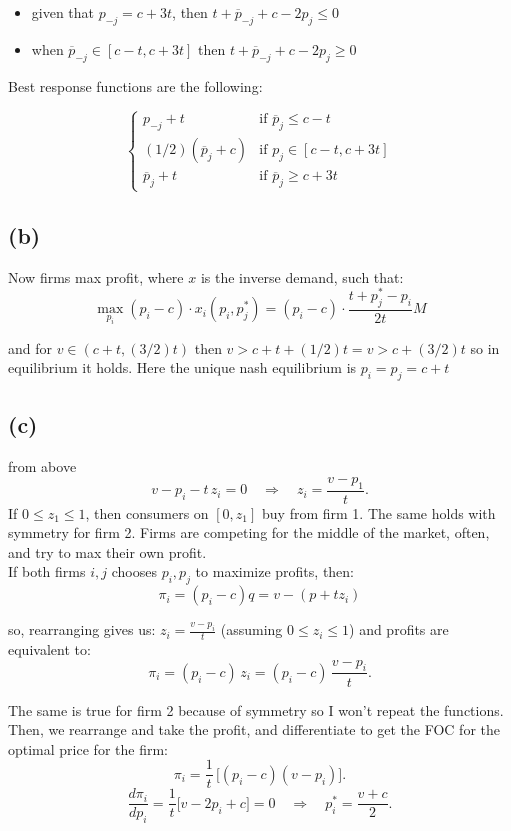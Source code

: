 \documentclass{article}
\begin{document}
\begin{itemize}
    \item given that $p_{-j} = c + 3t$, then $t + \overline{p}_{-j} + c - 2p_j \leq 0$
    \item when $\overline{p}_{-j} \in [c - t, c+3t]$ then $ t + \overline{p}_{-j} + c - 2p_j \geq 0$
\end{itemize}

Best response functions are the following:

\[
\left\{
  \begin{array}{ll}
    p_{-j} + t & \text{if } \overline{p}_{j} \leq c - t\\
    (1/2)(\overline{p}_j + c) & \text{if } p_j \in [c-t, c+3t]\\
    \overline{p}_j + t & \text{if } \overline{p}_j \geq c + 3t
    \end{array}
\right.
\]


\subsection*{(b)}
Now firms max profit, where $x$ is the inverse demand, such that: 
\[
\max_{p_i} (p_i - c) \cdot x_i(p_i, p_j^*) = (p_i - c) \cdot \frac{t + p_j^* - p_i}{2t} M
\]

and for $v \in (c + t, (3/2)t)$ then $ v > c + t + (1/2)t = v > c + (3/2)t$ so in equilibrium it holds. Here the unique nash equilibrium is $p_i = p_j = c + t $

\subsection*{(c)}
from above 
\[
v - p_i - t\, z_i = 0 \quad \Longrightarrow \quad z_i = \frac{v - p_1}{t}.
\]
If $0 \le z_1 \le 1$, then consumers on $[0, z_1]$ buy from firm 1. The same holds with symmetry for firm 2. Firms are competing for the middle of the market, often, and try to max their own profit. 
\\
If both firms $i, j$ chooses $p_i, p_j$ to maximize profits, then:
\[
\pi_i = (p_i - c)q = v - (p + tz_i) 
\]

so, rearranging gives us: $z_i = \tfrac{v - p_i}{t}$ (assuming $0 \le z_i \le 1$) and profits are equivalent to:
  \[
  \pi_i = (p_i - c)\,z_i = (p_i - c)\,\frac{v - p_i}{t}.
  \]

The same is true for firm 2 because of symmetry so I won't repeat the functions. Then, we rearrange and take the profit, and differentiate to get the FOC for the optimal price for the firm: 
\[
\pi_i = \frac{1}{t}\,\bigl[(p_i - c)(v - p_i)\bigr].
\]
\[
\frac{d\pi_i}{dp_i} = \frac{1}{t}\bigl[v - 2p_i + c\bigr] = 0
\quad\Longrightarrow\quad p_i^* = \frac{v + c}{2}.
\]
\end{document}
